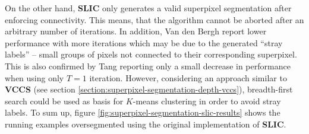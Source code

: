 On the other hand, \textbf{SLIC} only generates a valid superpixel segmentation after enforcing connectivity. This means, that the algorithm cannot be aborted after an arbitrary number of iterations. In addition, Van den Bergh \etal \cite{VanDenBerghBoixRoigVanGool:2013} report lower performance with more iterations which may be due to the generated ``stray labels'' \cite{VanDenBerghBoixRoigVanGool:2013} -- small groups of pixels not connected to their corresponding superpixel. This is also confirmed by Tang \etal \cite{DaiTangHuazhaFuXiaochunCao:2012} reporting only a small decrease in performance when using only $T = 1$ iteration. However, considering an approach similar to \textbf{VCCS} \cite{PaponAbramovSchoelerWoergoetter:2013} (see section \ref{section:superpixel-segmentation-depth-vccs}), breadth-first search could be used as basis for $K$-means clustering in order to avoid stray labels. To sum up, figure \ref{fig:superpixel-segmentation-slic-results} shows the running examples oversegmented using the original implementation of \textbf{SLIC}.
